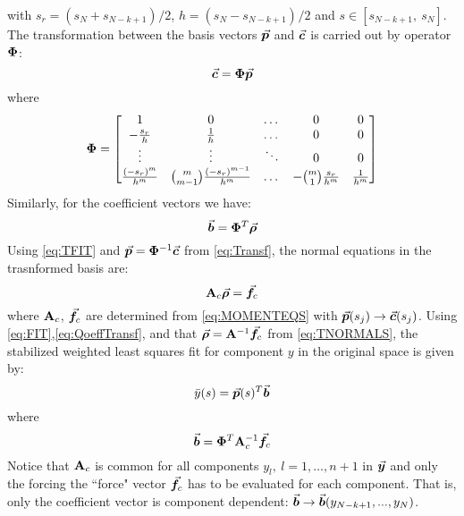 with $s_r=(s_N+s_{N-k+1})^{}/2$, $h=(s_N-s_{N-k+1})^{}/2$ and $s\in[s_{N-k+1},\
s_N]$. The transformation between the basis vectors $\vec{\bm{p}}$ and $\vec{\bm{c}}$ is
carried out by operator $\mathbf{\Phi}$:
\begin{equation}
	\vec{\bm{c}}=\mathbf{\Phi}\vec{\bm{p}}
	\label{eq:Transf}
\end{equation}
where
\begin{equation}
	\mathbf{\Phi} = \begin{bmatrix}
		1        &      0      & \dots & 0 & 0\\
		-\frac{s_r}{h} & \frac{1}{h} & \dots & 0 & 0\\
		\vdots     & \vdots      & \ddots& 0 & 0\\
		\frac{(-s_r)^m}{h^m} & \binom{m}{m-1}\frac{(-s_r)^{m-1}}{h^m} & \dots
		& -\binom{m}{1}\frac{s_r}{h^m} & \frac{1}{h^m}
	\end{bmatrix}
	\label{eq:OPERATOR}
\end{equation}
Similarly, for the coefficient vectors we have:
\begin{equation}
	\vec{\bm{b}}=\mathbf{\Phi}^T\vec{\bm{\rho}}
	\label{eq:QoeffTransf}
\end{equation}
Using \ref{eq:TFIT} and $\vec{\bm{p}}=\mathbf{\Phi}^{-1}\vec{\bm{c}}$ from 
\ref{eq:Transf}, 
the
normal equations in the trasnformed basis are:
\begin{equation}
	\mathbf{A}_c\vec{\bm{\rho}}=\vec{\bm{f}}_c
	\label{eq:TNORMALS}
\end{equation}
where $\mathbf{A}_c$, $\vec{\bm{f}}_c$ are determined from \ref{eq:MOMENTEQS} with
$\vec{\bm{p}}(s_j)\rightarrow \vec{\bm{c}}(s_j)$. Using 
\ref{eq:FIT},\ref{eq:QoeffTransf},
and that $\vec{\bm{\rho}}=\mathbf{A}^{-1}\vec{\bm{f}}_c$ from \ref{eq:TNORMALS}, the 
stabilized weighted least squares fit for component $y$ in the original
space is given by:
\begin{equation}
	\bar{y}(s)=\vec{\bm{p}}(s)^T\vec{\bm{b}}
	\label{eq:SWLSF}
\end{equation}
where
\begin{equation}
	\vec{\bm{b}} = \mathbf{\Phi}^T\mathbf{A}_c^{-1}\vec{\bm{f}}_c
	\label{eq:compCoef}
\end{equation}
Notice that $\mathbf{A}_c$ is common for all components $y_l,\ l=1,\dots, n+1$ in
$\vec{\bm{y}}$ and only the forcing the ``force" vector $\vec{\bm{f}}_c$ has to be
evaluated for each component. That is, only the coefficient vector is component
dependent: $\vec{\bm{b}}\rightarrow \vec{\bm{b}}(y_{N-k+1},...,y_N)$. 

